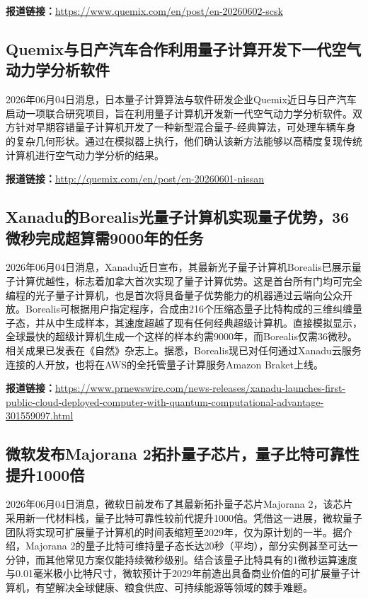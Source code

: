 \documentclass[12pt,a4paper]{ctexart}
\begin{document}
\noindent\textbf{报道链接：}\url{https://www.quemix.com/en/post/en-20260602-scsk}

\subsection{ Quemix与日产汽车合作利用量子计算开发下一代空气动力学分析软件 }

2026年06月04日消息，日本量子计算算法与软件研发企业Quemix近日与日产汽车启动一项联合研究项目，旨在利用量子计算机开发新一代空气动力学分析软件。双方针对早期容错量子计算机开发了一种新型混合量子-经典算法，可处理车辆车身的复杂几何形状。通过在模拟器上执行，他们确认该新方法能够以高精度复现传统计算机进行空气动力学分析的结果。

\noindent\textbf{报道链接：}\url{http://quemix.com/en/post/en-20260601-nissan}

\subsection{ Xanadu的Borealis光量子计算机实现量子优势，36微秒完成超算需9000年的任务 }

2026年06月04日消息，Xanadu近日宣布，其最新光子量子计算机Borealis已展示量子计算优越性，标志着加拿大首次实现了量子计算优势。这是首台所有门均可完全编程的光子量子计算机，也是首次将具备量子优势能力的机器通过云端向公众开放。Borealis可根据用户指定程序，合成由216个压缩态量子比特构成的三维纠缠量子态，并从中生成样本，其速度超越了现有任何经典超级计算机。直接模拟显示，全球最快的超级计算机生成一个这样的样本约需9000年，而Borealis仅需36微秒。相关成果已发表在《自然》杂志上。据悉，Borealis现已对任何通过Xanadu云服务连接的人开放，也将在AWS的全托管量子计算服务Amazon Braket上线。

\noindent\textbf{报道链接：}\url{https://www.prnewswire.com/news-releases/xanadu-launches-first-public-cloud-deployed-computer-with-quantum-computational-advantage-301559097.html}

\subsection{ 微软发布Majorana 2拓扑量子芯片，量子比特可靠性提升1000倍 }

2026年06月04日消息，微软日前发布了其最新拓扑量子芯片Majorana 2，该芯片采用新一代材料栈，量子比特可靠性较前代提升1000倍。凭借这一进展，微软量子团队将实现可扩展量子计算机的时间表缩短至2029年，仅为原计划的一半。据介绍，Majorana 2的量子比特可维持量子态长达20秒（平均），部分实例甚至可达一分钟，而其他常见方案仅能持续微秒级别。结合该量子比特具有的1微秒运算速度与0.01毫米极小比特尺寸，微软预计于2029年前造出具备商业价值的可扩展量子计算机，有望解决全球健康、粮食供应、可持续能源等领域的棘手难题。
\end{document}
